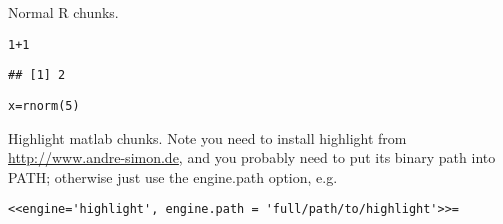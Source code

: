 \documentclass{article}\usepackage[]{graphicx}\usepackage[]{xcolor}
\makeatletter
\newcommand{\hlnum}[1]{\textcolor[rgb]{0.863,0.196,0.184}{#1}}%
\newcommand{\hlopt}[1]{\textcolor[rgb]{0.576,0.631,0.631}{#1}}%
\newcommand{\hldef}[1]{\textcolor[rgb]{0.514,0.58,0.588}{#1}}%
\newcommand{\hlkwb}[1]{\textcolor[rgb]{0.522,0.6,0}{#1}}%
\newcommand{\hlkwd}[1]{\textcolor[rgb]{0.576,0.631,0.631}{#1}}%
\newenvironment{kframe}{%
 \def\at@end@of@kframe{}%
 \ifinner\ifhmode%
  \def\at@end@of@kframe{\end{minipage}}%
  \begin{minipage}{\columnwidth}%
 \fi\fi%
 \def\FrameCommand##1{\hskip\@totalleftmargin \hskip-\fboxsep
 \colorbox{shadecolor}{##1}\hskip-\fboxsep
     \hskip-\linewidth \hskip-\@totalleftmargin \hskip\columnwidth}%
 \MakeFramed {\advance\hsize-\width
   \@totalleftmargin\z@ \linewidth\hsize
   \@setminipage}}%
 {\par\unskip\endMakeFramed%
 \at@end@of@kframe}
\newenvironment{knitrout}{}{} %
\makeatother
\begin{document}
Normal R chunks.

\begin{knitrout}
\color{fgcolor}\begin{kframe}
\begin{alltt}
\hlnum{1} \hlopt{+} \hlnum{1}
\end{alltt}
\begin{verbatim}
## [1] 2
\end{verbatim}
\begin{alltt}
\hldef{x} \hlkwb{=} \hlkwd{rnorm}\hldef{(}\hlnum{5}\hldef{)}
\end{alltt}
\end{kframe}
\end{knitrout}

Highlight matlab chunks. Note you need to install highlight from \url{http://www.andre-simon.de}, and you probably need to put its binary path into PATH; otherwise just use the engine.path option, e.g.

\noindent\verb|<<engine='highlight', engine.path = 'full/path/to/highlight'>>=|
\end{document}
